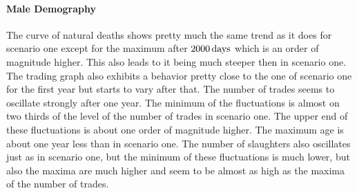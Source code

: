 \paragraph{Male Demography}
The curve of natural deaths shows pretty much the same trend as it does for scenario one except for the maximum after $2000\,\text{days}$ which is an order of magnitude higher. This also leads to it being much steeper then in scenario one.
The trading graph also exhibits a behavior pretty close to the one of scenario one for the first year but starts to vary after that. The number of trades seems to oscillate strongly after one year. The minimum of the fluctuations is almost on two thirds of the level of the number of trades in scenario one. The upper end of these fluctuations is about one order of magnitude higher. The maximum age is about one year less than in scenario one. 
The number of slaughters also oscillates just as in scenario one, but the minimum of these fluctuations is much lower, but also the maxima are much higher and seem to be almost as high as the maxima of the number of trades. 


